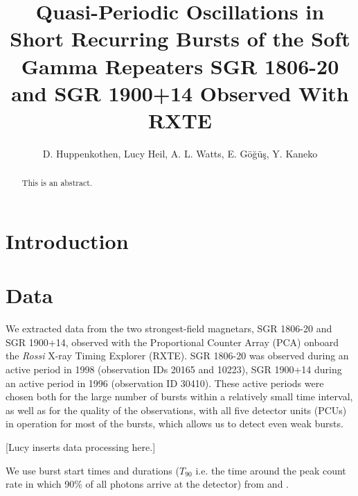 \documentclass[numberedappendix]{emulateapj}
\begin{document}
\title{Quasi-Periodic Oscillations in Short Recurring Bursts of the Soft Gamma Repeaters SGR 1806-20 and SGR 1900+14 Observed With RXTE}

\author{D. Huppenkothen, Lucy Heil, A. L. Watts,  E. G{\"o}{\u g}{\"u}{\c s}, Y. Kaneko}

 


\begin{abstract}
This is an abstract. 
\end{abstract}
\begin{abstract}
\end{abstract} 



\section{Introduction}

\section{Data}
\label{sec:data}

We extracted data from the two strongest-field magnetars, SGR 1806-20 and SGR 1900+14, observed with the Proportional Counter Array (PCA) onboard the {\it Rossi} X-ray Timing Explorer (RXTE). SGR 1806-20 was observed during an active period in 1998 (observation IDs 20165 and 10223), SGR 1900+14 during an active period in 1996 (observation ID 30410). These active periods were chosen both for the large number of bursts within a relatively small time interval, as well as for the quality of the observations, with all five detector units (PCUs) in operation for most of the bursts, which allows us to detect even weak bursts.

[Lucy inserts data processing here.]



We use burst start times and durations ($T_{90}$ i.e. the time around the peak count rate in which 90\% of all photons arrive at the detector) from \citet{gogus1999} and \citet{gogus2000}. 
\end{document}
